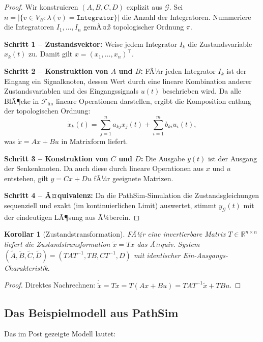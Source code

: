 ﻿\documentclass[12pt,a4paper]{article}
\newtheorem{korollar}[theorem]{Korollar}
\theoremstyle{definition}
\begin{document}
\begin{proof}
Wir konstruieren $(A, B, C, D)$ explizit aus $\mathcal{G}$. Sei
$n = |\{v \in V_B : \lambda(v) = \texttt{Integrator}\}|$ die Anzahl der
Integratoren. Nummeriere die Integratoren $I_1, \ldots, I_n$ gemÃ¤\ss{}
topologischer Ordnung $\pi$.

\textbf{Schritt 1 -- Zustandsvektor:} Weise jedem Integrator $I_k$ die
Zustandsvariable $x_k(t)$ zu. Damit gilt $x = (x_1, \ldots, x_n)^\top$.

\textbf{Schritt 2 -- Konstruktion von $A$ und $B$:} FÃ¼r jeden Integrator $I_k$
ist der Eingang ein Signalknoten, dessen Wert durch eine lineare Kombination
anderer Zustandsvariablen und des Eingangssignals $u(t)$ beschrieben wird.
Da alle BlÃ¶cke in $\mathcal{F}_{\mathrm{lin}}$ lineare Operationen darstellen,
ergibt die Komposition entlang der topologischen Ordnung:
\[
  \dot{x}_k(t) = \sum_{j=1}^n a_{kj} x_j(t) + \sum_{i=1}^m b_{ki} u_i(t),
\]
was $\dot{x} = Ax + Bu$ in Matrixform liefert.

\textbf{Schritt 3 -- Konstruktion von $C$ und $D$:} Die Ausgabe $y(t)$ ist
der Ausgang der Senkenknoten. Da auch diese durch lineare Operationen aus
$x$ und $u$ entstehen, gilt $y = Cx + Du$ fÃ¼r geeignete Matrizen.

\textbf{Schritt 4 -- Ã¤quivalenz:} Da die PathSim-Simulation die Zustandsgleichungen
sequenziell und exakt (im kontinuierlichen Limit) auswertet, stimmt
$y_{\mathcal{G}}(t)$ mit der eindeutigen LÃ¶sung aus  Ã¼berein.
\end{proof}

\begin{korollar}[Zustandstransformation]
\label{kor:transform}
FÃ¼r eine invertierbare Matrix $T \in \mathbb{R}^{n \times n}$ liefert die
Zustandstransformation $\tilde{x} = Tx$ das Ã¤quiv. System
$(\tilde{A}, \tilde{B}, \tilde{C}, \tilde{D}) = (TAT^{-1}, TB, CT^{-1}, D)$
mit identischer Ein-Ausgangs-Charakteristik.
\end{korollar}

\begin{proof}
Direktes Nachrechnen: $\dot{\tilde{x}} = T\dot{x} = T(Ax + Bu) = TAT^{-1}\tilde{x} + TBu$.
\end{proof}

\subsection{Das Beispielmodell aus PathSim}

Das im Post gezeigte Modell lautet:
\end{document}
